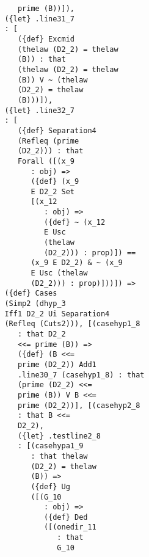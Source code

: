 \documentclass[12pt]{article}
\begin{document}
\begin{verbatim}
                               prime (B))]), 
                            ({let} .line31_7 
                            : [
                               ({def} Excmid 
                               (thelaw (D2_2) = thelaw 
                               (B)) : that 
                               (thelaw (D2_2) = thelaw 
                               (B)) V ~ (thelaw 
                               (D2_2) = thelaw 
                               (B)))]), 
                            ({let} .line32_7 
                            : [
                               ({def} Separation4 
                               (Refleq (prime 
                               (D2_2))) : that 
                               Forall ([(x_9 
                                  : obj) => 
                                  ({def} (x_9 
                                  E D2_2 Set 
                                  [(x_12 
                                     : obj) => 
                                     ({def} ~ (x_12 
                                     E Usc 
                                     (thelaw 
                                     (D2_2))) : prop)]) == 
                                  (x_9 E D2_2) & ~ (x_9 
                                  E Usc (thelaw 
                                  (D2_2))) : prop)]))]) => 
                            ({def} Cases 
                            (Simp2 (dhyp_3 
                            Iff1 D2_2 Ui Separation4 
                            (Refleq (Cuts2))), [(casehyp1_8 
                               : that D2_2 
                               <<= prime (B)) => 
                               ({def} (B <<= 
                               prime (D2_2)) Add1 
                               .line30_7 (casehyp1_8) : that 
                               (prime (D2_2) <<= 
                               prime (B)) V B <<= 
                               prime (D2_2))], [(casehyp2_8 
                               : that B <<= 
                               D2_2), 
                               ({let} .testline2_8 
                               : [(casehypa1_9 
                                  : that thelaw 
                                  (D2_2) = thelaw 
                                  (B)) => 
                                  ({def} Ug 
                                  ([(G_10 
                                     : obj) => 
                                     ({def} Ded 
                                     ([(onedir_11 
                                        : that 
                                        G_10 

\end{verbatim}
\end{document}
